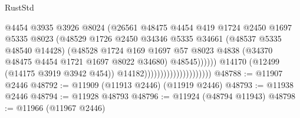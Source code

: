 \begin{lexlean}{RustStd}
\begin{coremodule}
{\begin{coremodule}
{{{{{{{{{{{{{{{{{{{{{{{{{{{{{{{{{{{{{{{{{{{{{{{{{{{{{{{{{{{{{{{{{{{{{{{{{{{{{{{{                                                    @4454
                                                    @3935
                                                    @3926
                                                    @8024
                                                    (@26561
                                                      @48475
                                                      @4454
                                                      @419
                                                      @1724
                                                      @2450
                                                      @1697
                                                      @5335
                                                      @8023
                                                      (@48529
                                                        @1726
                                                        @2450
                                                        @34346
                                                        @5335
                                                        @34661
                                                        (@48537 @5335 @48540 @14428)
                                                        (@48528
                                                          @1724
                                                          @169
                                                          @1697
                                                          @57
                                                          @8023
                                                          @4838
                                                          (@34370
                                                            @48475
                                                            @4454
                                                            @1721
                                                            @1697
                                                            @8022
                                                            @34680)
                                                          @48545))))))
                                              @14170
                                              (@12499 (@14175 @3919 @3942 @454))
                                              @14182)))))))))))))))))))))
@48788 := @11907 @2446
@48792 := @11909 (@11913 @2446) (@11919 @2446)
@48793 := @11938 @2446
@48794 := @11928 @48793
@48796 := @11924 (@48794 @11943)
@48798 := @11966 (@11967 @2446)
}}}}}}}}}}}}}}}}}}}}}}}}}}}}}}}}}}}}}}}}}}}}}}}}}}}}}}}}}}}}}}}}}}}}}}}}}}}}}}}}
\end{coremodule}}
\end{coremodule}
\end{lexlean}
